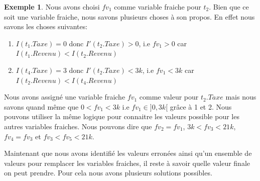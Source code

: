 \documentclass[letterpaper, 12pt]{report}
\theoremstyle{definition}
\newtheorem{myexample}{Exemple}
\begin{document}
\begin{myexample}
Nous avons choisi $fv_1$ comme variable fraiche pour $t_2$. Bien que ce soit une variable fraiche, nous savons plusieurs choses à son propos. En effet nous savons les choses suivantes:
\begin{enumerate}

\item $I(t_1.Taxe)=0$ donc $I'(t_2.Taxe)>0$, i.e $fv_1>0$ car $I(t_1.Revenu)<I(t_2.Revenu)$
\item $I(t_4.Taxe)=3$ donc $I'(t_2.Taxe)<3k$, i.e $fv_1<3k$ car $I(t_2.Revenu)<I(t_4.Revenu)$

\end{enumerate}

Nous avons assigné une variable fraiche $fv_1$ comme valeur pour $t_2.Taxe$ mais nous savons quand même que $0<fv_1<3k$ i.e $fv_1 \in ]0,3k[$ grâce à 1 et 2. Nous pouvons utiliser la même logique pour connaitre les valeurs possible pour les autres variables fraiches. Nous pouvons dire que $fv_2 = fv_1$, $3k<fv_3<21k$, $fv_4 = fv_3$ et $fv_3<fv_5<21k$.
\end{myexample}

Maintenant que nous avons identifié les valeurs erronées ainsi qu'un ensemble de valeurs pour remplacer les variables fraiches, il reste à savoir quelle valeur finale on peut prendre. Pour cela nous avons plusieurs solutions possibles.\\
\end{document}

